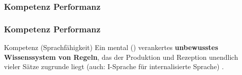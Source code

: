 \subsubsection{Kompetenz \vs Performanz}



\begin{frame}
\frametitle{Kompetenz \vs Performanz}

\begin{block}{Kompetenz (Sprachfähigkeit)}
Ein mental () verankertes \textbf{unbewusstes Wissenssystem von Regeln}, das der Produktion und Rezeption unendlich vieler Sätze zugrunde liegt (auch: I-Sprache für internalisierte Sprache) \citep[vgl.][]{Fries&MyP16d}.
\end{block}	


\end{frame}


